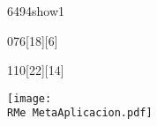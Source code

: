 \begin{NuevaPagina}{64}{94}{show1}
	\CabeceraDePoster{\MATERIA} 
	\begin{NuevoParrafo}{0}{76}[18][6]
		\begin{Marco}[\LineaSupC][\LineaInfC][\LineaIzqC][\LineaDerC][CBlanco]
		\end{Marco}
	\end{NuevoParrafo} 
	\CiudadFechaVolumen
	\begin{NuevoParrafo}{11}{0}[22][14]
		\begin{Marco}[\LineaSupC][\LineaInfC][\LineaIzqC][\LineaDerC][CBlanco]
			\centering\texttt{[image: \\RMe MetaAplicacion.pdf]}		
		\end{Marco}
	\end{NuevoParrafo}	
	
	

\end{NuevaPagina}
